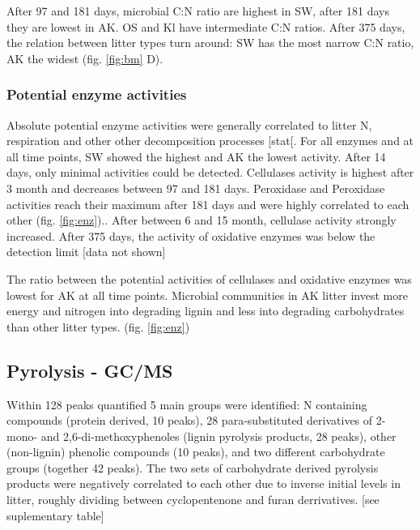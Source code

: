 After 97 and 181 days, microbial C:N ratio are highest in SW, after 181 days they are lowest in AK. OS and Kl have intermediate C:N ratios. After 375 days, the relation between litter types turn around: SW has the most narrow C:N ratio, AK the widest (fig. \ref{fig:bm} D).

\subsubsection{Potential enzyme activities}

Absolute potential enzyme activities were generally correlated to litter N, respiration and other other decomposition processes [stat[. For all enzymes and at all time points, SW showed the highest and AK the lowest activity. After 14 days, only minimal activities could be detected. Cellulases activity is highest after 3 month and decreases between 97 and 181 days. Peroxidase and Peroxidase activities reach their maximum after 181 days and were highly correlated to each other (fig. \ref{fig:enz}).. After between 6 and 15 month, cellulase activity strongly increased. After 375 days, the activity of oxidative enzymes was below the detection limit [data not shown]

The ratio between the potential activities of cellulases and oxidative enzymes was lowest for AK at all time points. Microbial communities in AK litter invest more energy and nitrogen into degrading lignin and less into degrading carbohydrates than other litter types. (fig. \ref{fig:enz})

% 
%  
\subsection{Pyrolysis - GC/MS}

Within 128 peaks quantified 5 main groups were identified: N containing compounds (protein derived, 10 peaks), 28 para-substituted derivatives of 2-mono- and 2,6-di-methoxyphenoles (lignin pyrolysis products, 28 peaks), other (non-lignin) phenolic compounds (10 peaks), and two different carbohydrate groups (together 42 peaks). The two sets of carbohydrate derived pyrolysis products were negatively correlated to each other due to inverse initial levels in litter, roughly dividing between cyclopentenone and furan derrivatives. [see suplementary table]

